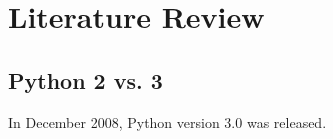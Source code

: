 \section{Literature Review}

\subsection{Python 2 vs. 3}
In December 2008, Python version 3.0 was released.
